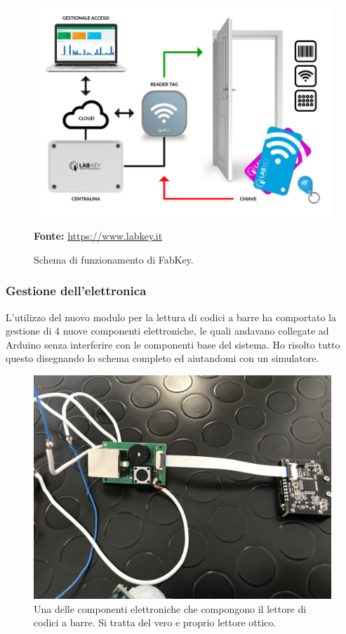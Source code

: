 \begin{figure}[H]
	\begin{center}
	\includegraphics[scale=0.4]{immagini/schema_labkey.jpg}
	\caption{Schema di funzionamento di FabKey.}
	\small{\textbf{Fonte:} \url{https://www.labkey.it}}
	\end{center}
\end{figure}

\subsubsection{Gestione dell'elettronica}
L'utilizzo del nuovo modulo per la lettura di codici a barre ha comportato la gestione di 4 nuove componenti elettroniche, le quali andavano collegate ad Arduino senza interferire con le componenti base del sistema.
Ho risolto tutto questo disegnando lo schema completo ed aiutandomi con un simulatore.

\begin{figure}[H]
	\begin{center}
	\includegraphics[scale=0.065]{immagini/lettore_barcode.jpg}
	\caption{Una delle componenti elettroniche che compongono il lettore di codici a barre. Si tratta del vero e proprio lettore ottico.}
	\end{center}
\end{figure}

